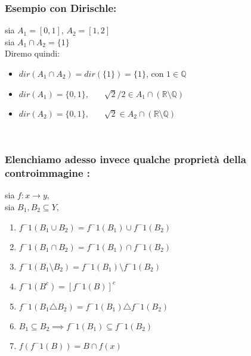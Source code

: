 \documentclass[article,12pt]{book}
\begin{document}
\begin{enumerate}
{\begin{enumerate}
\subsubsection{Esempio con Dirischle:}
sia $A_1 = [0,1]$, $A_2 = [1,2]$ \\
sia $A_1 \cap A_2 = \{1 \}$ \\[2EX]
Diremo quindi: 
    \begin{itemize}
        \item $dir(A_1 \cap A_2) = dir (\{1 \}) = \{1 \}$, con $1 \in \mathbb{Q}$
        \item $dir(A_1) = \{0, 1 \}, \ \ \ \ \ \ \ \ \sqrt{2}/2 \in A_1 \cap (\mathbb{R} \setminus \mathbb{Q})$
        \item $dir(A_2) = \{0, 1 \}, \ \ \ \ \ \ \ \ \sqrt{2} \in A_2 \cap (\mathbb{R} \setminus \mathbb{Q})$
    \end{itemize}

    
\end{enumerate} \\
\subsubsection{Elenchiamo adesso invece qualche proprietà della controimmagine :}
sia $f : x \rightarrow y$, \\
sia $B_1, B_2 \subseteq Y$, \\
\begin{enumerate}
    \item $f^-1 (B_1 \cup B_2) =  f^-1 (B_1) \cup f^-1 (B_2)$
    \item $f^-1 (B_1 \cap B_2) = f^-1 (B_1) \cap f^-1 (B_2)$
    \item $f^-1 (B_1 \setminus B_2) = f^-1 (B_1) \setminus f^-1 (B_2)$
    \item $f^-1 (B^c) = [f^-1(B)]^c$
    \item $f^-1 (B_1 \triangle B_2) = f^-1 (B_1) \triangle f^-1 (B_2)$
    \item $B_1 \subseteq B_2 \implies f^-1 (B_1) \subseteq f^-1 (B_2)$
    \item $f(f^-1 (B)) = B \cap f(x)$
    
\end{enumerate}

\newpage
}
\end{enumerate}
\end{document}
